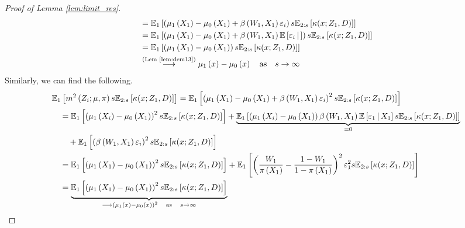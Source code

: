 \begin{proof}[Proof of Lemma \ref{lem:limit_res}]
\begin{equation}
\begin{aligned}
			& = \mathbb{E}_{1}\left[\left(\mu_1\left(X_{1}\right) - \mu_0\left(X_{1}\right) + \beta\left(W_{1}, X_{1}\right)\varepsilon_{i}\right) s \mathbb{E}_{2:s}\left[\kappa(x; Z_1, D)\right]\right] \\
			& = \mathbb{E}_{1}\left[\left(\mu_1\left(X_{1}\right) - \mu_0\left(X_{1}\right) + \beta\left(W_{1}, X_{1}\right)\mathbb{E}\left[\varepsilon_{i} \, \middle| \, \right]\right) s \mathbb{E}_{2:s}\left[\kappa(x; Z_1, D)\right]\right] \\
			& = \mathbb{E}_{1}\left[\left(\mu_1\left(X_{1}\right) - \mu_0\left(X_{1}\right)\right) s \mathbb{E}_{2:s}\left[\kappa(x; Z_1, D)\right]\right] \\
			& \overset{\text{(Lem \ref{lem:dem13})}}{\longrightarrow} \mu_1\left(x\right) - \mu_0\left(x\right)
			\quad \text{as} \quad s \rightarrow \infty
		\end{aligned}
	\end{equation}
	Similarly, we can find the following.
	\begin{equation}
		\begin{aligned}
			& \E_{1}\left[m^2\left(Z_{i}; \mu, \pi\right) s \E_{2:s}\left[\kappa(x; Z_1, D)\right]\right]
			= \E_{1}\left[\left(\mu_1\left(X_{1}\right) - \mu_0\left(X_{1}\right) + \beta\left(W_{1}, X_{1}\right)\varepsilon_{i}\right)^2 s \E_{2:s}\left[\kappa(x; Z_1, D)\right]\right] \\
			& \quad = \E_{1}\left[\left(\mu_1\left(X_{i}\right) - \mu_0\left(X_{1}\right)\right)^2 s \E_{2:s}\left[\kappa(x; Z_1, D)\right]\right]
			+ \underbrace{\E_{1}\left[\left(\mu_1\left(X_{i}\right) - \mu_0\left(X_{1}\right)\right)\beta\left(W_{1}, X_{1}\right)\E\left[\varepsilon_{1} \, \middle| \, X_1\right] s \E_{2:s}\left[\kappa(x; Z_1, D)\right]\right]}_{=0} \\
			& \quad \quad + \E_{1}\left[\left(\beta\left(W_{1}, X_{1}\right)\varepsilon_{i}\right)^2 s \E_{2:s}\left[\kappa(x; Z_1, D)\right]\right]\\
			& \quad =  \E_{1}\left[\left(\mu_1\left(X_{1}\right) - \mu_0\left(X_{1}\right)\right)^2 s \E_{2:s}\left[\kappa(x; Z_1, D)\right]\right]
			+ \E_{1}\left[\left(\frac{W_{1}}{\pi\left(X_1\right)} - \frac{1 - W_{1}}{1 - \pi\left(X_1\right)}\right)^2 \varepsilon_{1}^2 s \E_{2:s}\left[\kappa(x; Z_1, D)\right]\right]\\
			& \quad = \underbrace{\E_{1}\left[\left(\mu_1\left(X_{1}\right) - \mu_0\left(X_{1}\right)\right)^2 s \E_{2:s}\left[\kappa(x; Z_1, D)\right]\right]}_{\longrightarrow \left(\mu_1\left(x\right) - \mu_0\left(x\right)\right)^2 \quad \text{as} \quad s \rightarrow \infty}

\end{aligned}
\end{equation}
\end{proof}
